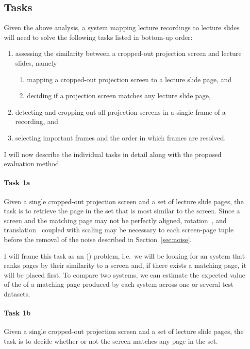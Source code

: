 \subsection{Tasks}
\label{sec:tasks}
Given the above analysis, a system mapping lecture recordings to lecture slides
will need to solve the following tasks listed in bottom-up order:
\begin{enumerate}
  \item assessing the similarity between a cropped-out projection screen and
    lecture slides, namely
    \begin{enumerate}
      \item mapping a cropped-out projection screen to a lecture slide page, and
      \item deciding if a projection screen matches any lecture slide page,
    \end{enumerate}
  \item detecting and cropping out all projection screens in a single frame
    of a recording, and
  \item selecting important frames and the order in which frames are resolved.
\end{enumerate}
I will now describe the individual tasks in detail along with the proposed
evaluation method.

\paragraph{Task 1a} Given a single cropped-out projection screen and a set of
lecture slide pages, the task is to retrieve the page in the set that is most
similar to the screen. Since a screen and the matching page may not be
perfectly aligned, rotation~\cite{smith1995simple}, and
translation~\cite{sarvaiyaetal09} coupled with scaling may be necessary to
 each screen-page tuple before the removal of the noise
described in Section~\ref{sec:noise}.

I will frame this task as an  () problem,
i.e.\ we will be looking for an  system that ranks pages by their
similarity to a screen and, if there exists a matching page, it will be placed
first. To compare two systems, we can estimate the expected value of the
 of a matching page produced by each system across one or several
test datasets.

\paragraph{Task 1b} Given a single cropped-out projection screen and a set of
lecture slide pages, the task is to decide whether or not the screen matches
any page in the set.

